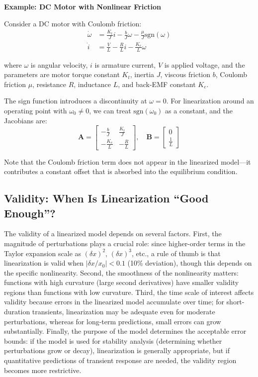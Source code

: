 \textbf{Example: DC Motor with Nonlinear Friction}

Consider a DC motor with Coulomb friction:
\begin{align}
\dot{\omega} &= \frac{K_t}{J}i - \frac{b}{J}\omega - \frac{\mu}{J}\text{sgn}(\omega) \\
\dot{i} &= \frac{V}{L} - \frac{R}{L}i - \frac{K_e}{L}\omega
\end{align}

where $\omega$ is angular velocity, $i$ is armature current, $V$ is applied voltage, and the parameters are motor torque constant $K_t$, inertia $J$, viscous friction $b$, Coulomb friction $\mu$, resistance $R$, inductance $L$, and back-EMF constant $K_e$.

The sign function introduces a discontinuity at $\omega = 0$. For linearization around an operating point with $\omega_0 \neq 0$, we can treat $\text{sgn}(\omega_0)$ as a constant, and the Jacobians are:
\begin{equation}
\mathbf{A} = \begin{bmatrix} -\frac{b}{J} & \frac{K_t}{J} \\ -\frac{K_e}{L} & -\frac{R}{L} \end{bmatrix}, \quad
\mathbf{B} = \begin{bmatrix} 0 \\ \frac{1}{L} \end{bmatrix}
\end{equation}

Note that the Coulomb friction term does not appear in the linearized model---it contributes a constant offset that is absorbed into the equilibrium condition.

\subsection{Validity: When Is Linearization ``Good Enough''?}

The validity of a linearized model depends on several factors. First, the magnitude of perturbations plays a crucial role: since higher-order terms in the Taylor expansion scale as $(\delta x)^2$, $(\delta x)^3$, etc., a rule of thumb is that linearization is valid when $|\delta x / x_0| < 0.1$ (10\% deviation), though this depends on the specific nonlinearity. Second, the smoothness of the nonlinearity matters: functions with high curvature (large second derivatives) have smaller validity regions than functions with low curvature. Third, the time scale of interest affects validity because errors in the linearized model accumulate over time; for short-duration transients, linearization may be adequate even for moderate perturbations, whereas for long-term predictions, small errors can grow substantially. Finally, the purpose of the model determines the acceptable error bounds: if the model is used for stability analysis (determining whether perturbations grow or decay), linearization is generally appropriate, but if quantitative predictions of transient response are needed, the validity region becomes more restrictive.

